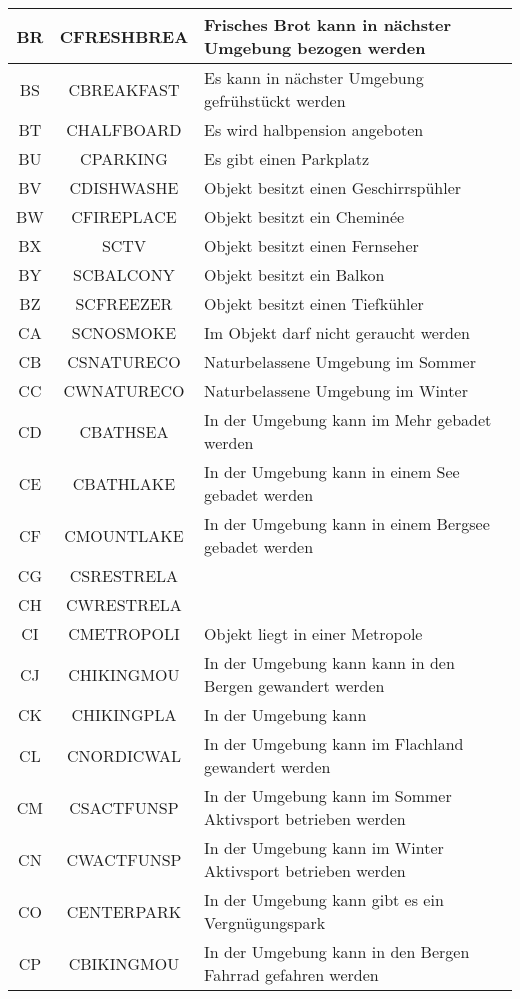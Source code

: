 \begin{longtable}{ | c | c | L{10cm} |}
	BR & CFRESHBREA & Frisches Brot kann in nächster Umgebung bezogen werden \\ \hline 
	BS & CBREAKFAST & Es kann in nächster Umgebung gefrühstückt werden \\ \hline 
	BT & CHALFBOARD & Es wird halbpension angeboten \\ \hline 
	BU & CPARKING & Es gibt einen Parkplatz \\ \hline 
	BV & CDISHWASHE & Objekt besitzt einen Geschirrspühler \\ \hline 
	BW & CFIREPLACE & Objekt besitzt ein Cheminée \\ \hline 
	BX & SCTV & Objekt besitzt einen Fernseher \\ \hline 
	BY & SCBALCONY & Objekt besitzt ein Balkon \\ \hline 
	BZ & SCFREEZER & Objekt besitzt einen Tiefkühler \\ \hline 
	CA & SCNOSMOKE & Im Objekt darf nicht geraucht werden \\ \hline 
	CB & CSNATURECO & Naturbelassene Umgebung im Sommer \\ \hline 
	CC & CWNATURECO & Naturbelassene Umgebung im Winter \\ \hline 
	CD & CBATHSEA & In der Umgebung kann im Mehr gebadet werden \\ \hline 
	CE & CBATHLAKE & In der Umgebung kann in einem See gebadet werden \\ \hline 
	CF & CMOUNTLAKE & In der Umgebung kann in einem Bergsee gebadet werden \\ \hline 
	CG & CSRESTRELA &  \\ \hline 
	CH & CWRESTRELA &  \\ \hline 
	CI & CMETROPOLI & Objekt liegt in einer Metropole \\ \hline 
	CJ & CHIKINGMOU & In der Umgebung kann kann in den Bergen gewandert werden \\ \hline 
	CK & CHIKINGPLA& In der Umgebung kann  \\ \hline 
	CL & CNORDICWAL & In der Umgebung kann im Flachland gewandert werden \\ \hline 
	CM & CSACTFUNSP & In der Umgebung kann im Sommer Aktivsport betrieben werden \\ \hline 
	CN & CWACTFUNSP & In der Umgebung kann im Winter Aktivsport betrieben werden \\ \hline 
	CO & CENTERPARK & In der Umgebung kann gibt es ein Vergnügungspark \\ \hline 
	CP & CBIKINGMOU & In der Umgebung kann in den Bergen Fahrrad gefahren werden \\ \hline 

\end{longtable}
